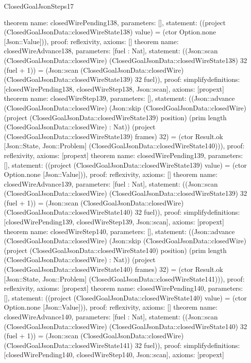 \begin{lexlean}{ClosedGoalJsonSteps17}
\begin{semanticmodule}
{}
theorem{
 name: closedWirePending138, parameters: [],
 statement: ((project (ClosedGoalJsonData::closedWireState138) value) = (ctor Option.none [Json::Value])), proof: reflexivity{}, axioms: []
}
theorem{
 name: closedWireAdvance138, parameters: [fuel : Nat],
 statement: ((Json::scan (ClosedGoalJsonData::closedWire) (ClosedGoalJsonData::closedWireState138) 32 (fuel + 1)) = (Json::scan (ClosedGoalJsonData::closedWire) (ClosedGoalJsonData::closedWireState139) 32 fuel)), proof: simplify{definitions: [closedWirePending138, closedWireStep138, Json::scan]}, axioms: [propext]
}
theorem{
 name: closedWireStep139, parameters: [],
 statement: ((Json::advance (ClosedGoalJsonData::closedWire) (Json::skip (ClosedGoalJsonData::closedWire) (project (ClosedGoalJsonData::closedWireState139) position) (prim length (ClosedGoalJsonData::closedWire) : Nat)) (project (ClosedGoalJsonData::closedWireState139) frames) 32) = (ctor Result.ok [Json::State, Json::Problem] (ClosedGoalJsonData::closedWireState140))), proof: reflexivity{}, axioms: [propext]
}
theorem{
 name: closedWirePending139, parameters: [],
 statement: ((project (ClosedGoalJsonData::closedWireState139) value) = (ctor Option.none [Json::Value])), proof: reflexivity{}, axioms: []
}
theorem{
 name: closedWireAdvance139, parameters: [fuel : Nat],
 statement: ((Json::scan (ClosedGoalJsonData::closedWire) (ClosedGoalJsonData::closedWireState139) 32 (fuel + 1)) = (Json::scan (ClosedGoalJsonData::closedWire) (ClosedGoalJsonData::closedWireState140) 32 fuel)), proof: simplify{definitions: [closedWirePending139, closedWireStep139, Json::scan]}, axioms: [propext]
}
theorem{
 name: closedWireStep140, parameters: [],
 statement: ((Json::advance (ClosedGoalJsonData::closedWire) (Json::skip (ClosedGoalJsonData::closedWire) (project (ClosedGoalJsonData::closedWireState140) position) (prim length (ClosedGoalJsonData::closedWire) : Nat)) (project (ClosedGoalJsonData::closedWireState140) frames) 32) = (ctor Result.ok [Json::State, Json::Problem] (ClosedGoalJsonData::closedWireState141))), proof: reflexivity{}, axioms: [propext]
}
theorem{
 name: closedWirePending140, parameters: [],
 statement: ((project (ClosedGoalJsonData::closedWireState140) value) = (ctor Option.none [Json::Value])), proof: reflexivity{}, axioms: []
}
theorem{
 name: closedWireAdvance140, parameters: [fuel : Nat],
 statement: ((Json::scan (ClosedGoalJsonData::closedWire) (ClosedGoalJsonData::closedWireState140) 32 (fuel + 1)) = (Json::scan (ClosedGoalJsonData::closedWire) (ClosedGoalJsonData::closedWireState141) 32 fuel)), proof: simplify{definitions: [closedWirePending140, closedWireStep140, Json::scan]}, axioms: [propext]
}
\end{semanticmodule}
\end{lexlean}
